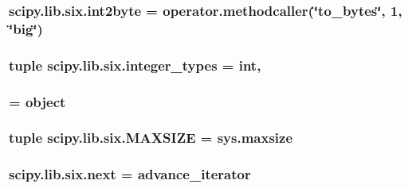\subsubsection[{int2byte}]{\setlength{\rightskip}{0pt plus 5cm}scipy.\+lib.\+six.\+int2byte = operator.\+methodcaller(\char`\"{}to\+\_\+bytes\char`\"{}, 1, \char`\"{}big\char`\"{})}\label{namespacescipy_1_1lib_1_1six_a8477fd1b64b34f0ddf52cf9389d65373}
\hypertarget{namespacescipy_1_1lib_1_1six_ab3d712263074d969314c1557a5278962}{}
\subsubsection[{integer\+\_\+types}]{\setlength{\rightskip}{0pt plus 5cm}tuple scipy.\+lib.\+six.\+integer\+\_\+types = int,}\label{namespacescipy_1_1lib_1_1six_ab3d712263074d969314c1557a5278962}
\hypertarget{namespacescipy_1_1lib_1_1six_a8da3a9399ce223ec6de35326dc084c3c}{}
\subsubsection[{Iterator}]{ = object}\label{namespacescipy_1_1lib_1_1six_a8da3a9399ce223ec6de35326dc084c3c}
\hypertarget{namespacescipy_1_1lib_1_1six_a0e44d1c92a1c1235e042733d43ffa569}{}
\subsubsection[{M\+A\+X\+S\+I\+Z\+E}]{\setlength{\rightskip}{0pt plus 5cm}tuple scipy.\+lib.\+six.\+M\+A\+X\+S\+I\+Z\+E = sys.\+maxsize}\label{namespacescipy_1_1lib_1_1six_a0e44d1c92a1c1235e042733d43ffa569}
\hypertarget{namespacescipy_1_1lib_1_1six_ad6757495ee04551ef94f22f4e8b786cf}{}
\subsubsection[{next}]{\setlength{\rightskip}{0pt plus 5cm}scipy.\+lib.\+six.\+next = {\bf advance\+\_\+iterator}}\label{namespacescipy_1_1lib_1_1six_ad6757495ee04551ef94f22f4e8b786cf}
\hypertarget{namespacescipy_1_1lib_1_1six_ab1b83507fcfda92ca93a2ef23d5f727f}{}
